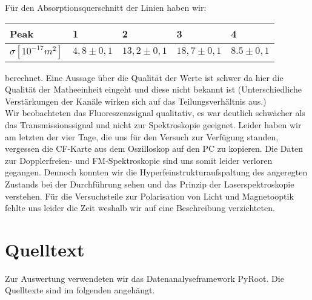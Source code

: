 \documentclass[12pt]{article}
\begin{document}
Für den Absorptionsquerschnitt der Linien haben wir:
\begin{center}
\begin{tabular}{|l|l|l|l|l|}
\hline 
Peak & 1 & 2 & 3 & 4\\
\hline
$\sigma [10^{-17} m^2]$ & $4,8 \pm 0,1$ & $13,2 \pm 0,1$ & $18,7 \pm 0,1$ & $8.5 \pm 0,1$\\
\hline
\end{tabular}
\end{center}
berechnet. Eine Aussage über die Qualität der Werte ist schwer da hier die Qualität der Matheeinheit eingeht und diese nicht bekannt ist (Unterschiedliche Verstärkungen der Kanäle wirken sich auf das Teilungsverhältnis aus.)\\
Wir beobachteten das Fluoreszenzsignal qualitativ, es war deutlich schwächer als das Transmissionssignal und nicht zur Spektroskopie geeignet.
Leider haben wir am letzten der vier Tage, die uns für den Versuch zur Verfügung standen, vergessen die CF-Karte aus dem Oszilloskop auf den PC zu kopieren. Die Daten zur Dopplerfreien- und FM-Spektroskopie sind uns somit leider verloren gegangen. Dennoch konnten wir die Hyperfeinstrukturaufspaltung des angeregten Zustands bei der Durchführung sehen und das Prinzip der Laserspektroskopie verstehen. Für die Versuchsteile zur Polarisation von Licht und Magnetooptik fehlte uns leider die Zeit weshalb wir auf eine Beschreibung verzichteten.
\section{Quelltext}
Zur Auswertung verwendeten wir das Datenanalyseframework PyRoot. Die Quelltexte sind im folgenden angehängt.









\end{document}
